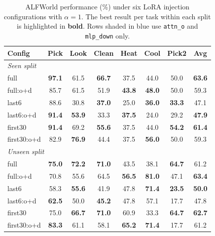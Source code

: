 \documentclass{llmxive}
\providecommand{\best}[1]{\textbf{#1}}
\providecommand{\arraystretch}{1.05}
\begin{document}
\begin{table}[t]
\centering
\small
\setlength{\tabcolsep}{2.5pt}
\renewcommand{\arraystretch}{1.1}
\begin{tabular}{l ccccccc}
\toprule
\textbf{Config}
  & \textbf{Pick} & \textbf{Look} & \textbf{Clean}
  & \textbf{Heat} & \textbf{Cool} & \textbf{Pick2}
  & \textbf{Avg} \\
\midrule
\multicolumn{8}{l}{\emph{Seen split}} \\[2pt]
full
  & \best{97.1} & 61.5 & \best{66.7} & 37.5 & 44.0 & 50.0 & \best{63.6} \\
\rowcolor{ourblue}
full:o+d
  & 85.7 & 61.5 & 51.9 & \best{43.8} & \best{48.0} & 50.0 & 59.3 \\
\midrule
last6
  & 88.6 & 30.8 & \best{37.0} & 25.0 & \best{36.0} & \best{33.3} & 47.1 \\
\rowcolor{ourblue}
last6:o+d
  & \best{91.4} & \best{53.9} & 33.3 & \best{37.5} & 24.0 & 29.2 & \best{47.9} \\
\midrule
first30
  & \best{91.4} & 69.2 & \best{55.6} & 37.5 & 44.0 & \best{54.2} & \best{61.4} \\
\rowcolor{ourblue}
first30:o+d
  & 82.9 & \best{76.9} & 44.4 & 37.5 & \best{56.0} & 50.0 & 59.3 \\
\midrule
\multicolumn{8}{l}{\emph{Unseen split}} \\[2pt]
full
  & \best{75.0} & \best{72.2} & \best{71.0} & 43.5 & 38.1 & \best{64.7} & 61.2 \\
\rowcolor{ourblue}
full:o+d
  & 70.8 & 55.6 & 64.5 & \best{56.5} & \best{81.0} & 47.1 & \best{63.4} \\
\midrule
last6
  & 58.3 & \best{55.6} & 41.9 & 47.8 & \best{71.4} & \best{23.5} & \best{50.0} \\
\rowcolor{ourblue}
last6:o+d
  & \best{62.5} & 50.0 & \best{45.2} & 47.8 & 57.1 & 17.7 & 47.8 \\
\midrule
first30
  & 75.0 & \best{66.7} & \best{71.0} & 60.9 & 33.3 & \best{64.7} & \best{62.7} \\
\rowcolor{ourblue}
first30:o+d
  & \best{83.3} & 61.1 & 58.1 & \best{65.2} & \best{71.4} & 17.7 & 61.2 \\
\bottomrule
\end{tabular}
\caption{
  ALFWorld performance (\%) under six LoRA injection configurations with $\alpha{=}1$. The best result per task within each split is highlighted in \textbf{bold}. Rows shaded in blue use \texttt{attn\_o} and \texttt{mlp\_down} only.
}
\label{tab:submodule}
\end{table}
\end{document}
